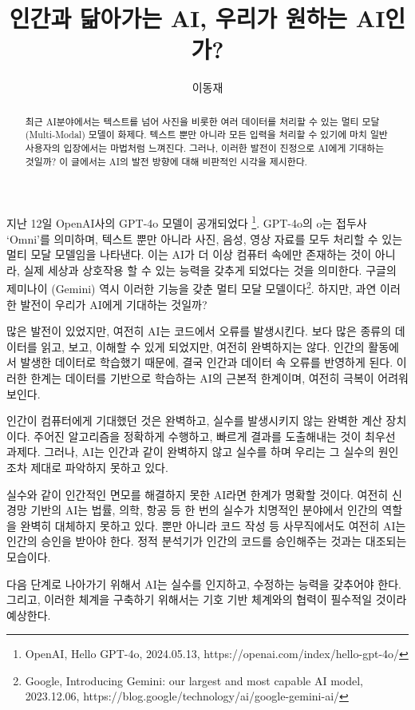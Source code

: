 \documentclass[11pt, oneside]{article}   	%
\title{인간과 닮아가는 AI, 우리가 원하는 AI인가?}
\author{이동재}
\date{}
\begin{document}
\maketitle


\begin{abstract}
  최근 AI분야에서는 텍스트를 넘어 사진을 비롯한 여러 데이터를 처리할 수 있는 멀티 모달 (Multi-Modal) 모델이 화제다. 텍스트 뿐만 아니라 모든 입력을 처리할 수 있기에 마치 일반 사용자의 입장에서는 마법처럼 느껴진다. 그러나, 이러한 발전이 진정으로 AI에게 기대하는 것일까? 이 글에서는 AI의 발전 방향에 대해 비판적인 시각을 제시한다.
\end{abstract}
지난 12일 OpenAI사의 GPT-4o 모델이 공개되었다 \footnote{OpenAI, Hello GPT-4o, 2024.05.13, https://openai.com/index/hello-gpt-4o/}. GPT-4o의 o는 접두사 `Omni'를 의미하며, 텍스트 뿐만 아니라 사진, 음성, 영상 자료를 모두 처리할 수 있는 멀티 모달 모델임을 나타낸다. 이는 AI가 더 이상 컴퓨터 속에만 존재하는 것이 아니라, 실제 세상과 상호작용 할 수 있는 능력을 갖추게 되었다는 것을 의미한다. 구글의 제미나이 (Gemini) 역시 이러한 기능을 갖춘 멀티 모달 모델이다\footnote{Google, Introducing Gemini: our largest and most capable AI model, 2023.12.06, https://blog.google/technology/ai/google-gemini-ai/}. 하지만, 과연 이러한 발전이 우리가 AI에게 기대하는 것일까?

많은 발전이 있었지만, 여전히 AI는 코드에서 오류를 발생시킨다. 보다 많은 종류의 데이터를 읽고, 보고, 이해할 수 있게 되었지만, 여전히 완벽하지는 않다. 인간의 활동에서 발생한 데이터로 학습했기 때문에, 결국 인간과 데이터 속 오류를 반영하게 된다. 이러한 한계는 데이터를 기반으로 학습하는 AI의 근본적 한계이며, 여전히 극복이 어려워 보인다.

인간이 컴퓨터에게 기대했던 것은 완벽하고, 실수를 발생시키지 않는 완벽한 계산 장치이다. 주어진 알고리즘을 정확하게 수행하고, 빠르게 결과를 도출해내는 것이 최우선 과제다. 그러나, AI는 인간과 같이 완벽하지 않고 실수를 하며 우리는 그 실수의 원인 조차 제대로 파악하지 못하고 있다.

실수와 같이 인간적인 면모를 해결하지 못한 AI라면 한계가 명확할 것이다. 여전히 신경망 기반의 AI는 법률, 의학, 항공 등 한 번의 실수가 치명적인 분야에서 인간의 역할을 완벽히 대체하지 못하고 있다. 뿐만 아니라 코드 작성 등 사무직에서도 여전히 AI는 인간의 승인을 받아야 한다. 정적 분석기가 인간의 코드를 승인해주는 것과는 대조되는 모습이다.

다음 단계로 나아가기 위해서 AI는 실수를 인지하고, 수정하는 능력을 갖추어야 한다. 그리고, 이러한 체계을 구축하기 위해서는 기호 기반 체계와의 협력이 필수적일 것이라 예상한다.
\end{document}
